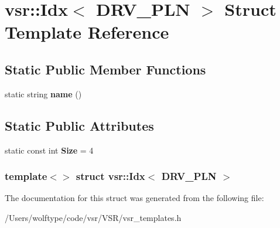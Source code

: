 \hypertarget{structvsr_1_1_idx_3_01_d_r_v___p_l_n_01_4}{\section{vsr\-:\-:Idx$<$ D\-R\-V\-\_\-\-P\-L\-N $>$ Struct Template Reference}
\label{structvsr_1_1_idx_3_01_d_r_v___p_l_n_01_4}
}
\subsection*{Static Public Member Functions}
\begin{DoxyCompactItemize}
\item 
\hypertarget{structvsr_1_1_idx_3_01_d_r_v___p_l_n_01_4_a308ed2094906cc0a4609b7bd418e1716}{static string {\bfseries name} ()}\label{structvsr_1_1_idx_3_01_d_r_v___p_l_n_01_4_a308ed2094906cc0a4609b7bd418e1716}

\end{DoxyCompactItemize}
\subsection*{Static Public Attributes}
\begin{DoxyCompactItemize}
\item 
\hypertarget{structvsr_1_1_idx_3_01_d_r_v___p_l_n_01_4_a1c9a4d118028a5c2761be82a7e081484}{static const int {\bfseries Size} = 4}\label{structvsr_1_1_idx_3_01_d_r_v___p_l_n_01_4_a1c9a4d118028a5c2761be82a7e081484}

\end{DoxyCompactItemize}
\subsubsection*{template$<$$>$ struct vsr\-::\-Idx$<$ D\-R\-V\-\_\-\-P\-L\-N $>$}



The documentation for this struct was generated from the following file\-:\begin{DoxyCompactItemize}
\item 
/\-Users/wolftype/code/vsr/\-V\-S\-R/vsr\-\_\-templates.\-h\end{DoxyCompactItemize}
